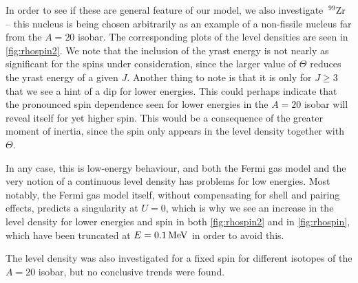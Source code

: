 In order to see if these are general feature of our model, we also investigate $~^{99}\mathrm{Zr}$ -- this nucleus is being chosen arbitrarily as an example of a non-fissile nucleus far from the $A=20$ isobar. The corresponding plots of the level densities are seen in \autoref{fig:rhospin2}. We note that the inclusion of the yrast energy is not nearly as significant for the spins under consideration, since the larger value of $\Theta$ reduces the yrast energy of a given $J$. %
Another thing to note is that it is only for $J\ge 3$ that we see a hint of a dip for lower energies. This could perhaps indicate that the pronounced spin dependence seen for lower energies in the $A=20$ isobar will reveal itself for yet higher spin. This would be a consequence of the greater moment of inertia, since the spin only appears in the level density together with $\Theta$.

In any case, this is low-energy behaviour, and both the Fermi gas model\cite{grossjean1985} and the very notion of a continuous level density has problems for low energies. Most notably, the Fermi gas model itself, without compensating for shell and pairing effects, predicts a singularity at $U=0$, which is why we see an increase in the level density for lower energies and spin in both \autoref{fig:rhospin2} and in \autoref{fig:rhospin}, which have been truncated at $E=\unit[0.1]{MeV}$ in order to avoid this.

The level density was also investigated for a fixed spin for different isotopes of the $A=20$ isobar, but no conclusive trends were found.

